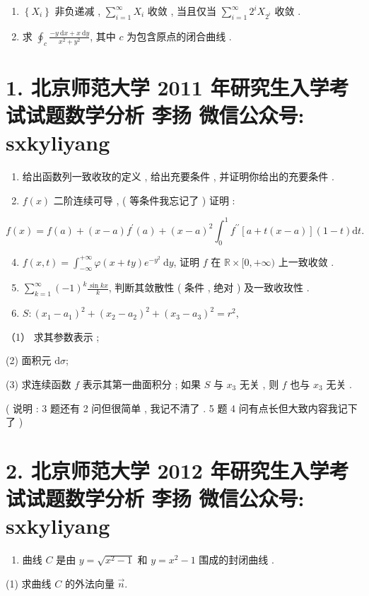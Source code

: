 \documentclass[10pt]{article}
\begin{document}
{\begin{enumerate}
  \item $\left\{X_{i}\right\}$  非负递减 , $\sum_{i=1}^{\infty} X_{i}$  收敛 ,  当且仅当  $\sum_{i=1}^{\infty} 2^{i} X_{2^{i}}$  收敛 .

  \item  求  $\oint_{c} \frac{-y \mathrm{~d} x+x \mathrm{~d} y}{x^{2}+y^{2}}$,  其中  $c$  为包含原点的闭合曲线 .

\end{enumerate}
\section{1. 北京师范大学 2011 年研究生入学考试试题数学分析 
 李扬 
 微信公众号: sxkyliyang}
\begin{enumerate}
  \item  给出函数列一致收玫的定义 ,  给出充要条件 ,  并证明你给出的充要条件 .

  \item $f(x)$  二阶连续可导 , ( 等条件我忘记了 )  证明 :

\end{enumerate}
$$
f(x)=f(a)+(x-a) f^{\prime}(a)+(x-a)^{2} \int_{0}^{1} f^{\prime \prime}[a+t(x-a)](1-t) \mathrm{d} t .
$$

\begin{enumerate}
  \setcounter{enumi}{3}
  \item $f(x, t)=\int_{-\infty}^{+\infty} \varphi(x+t y) e^{-y^{2}} \mathrm{~d} y$,  证明  $f$  在  $\mathbb{R} \times[0,+\infty)$  上一致收敛 .

  \item $\sum_{k=1}^{\infty}(-1)^{k} \frac{\sin k x}{k}$,  判断其敛散性  ( 条件 ,  绝对 )  及一致收玫性 .

  \item $S:\left(x_{1}-a_{1}\right)^{2}+\left(x_{2}-a_{2}\right)^{2}+\left(x_{3}-a_{3}\right)^{2}=r^{2}$,

\end{enumerate}
（1） 求其参数表示 ;

(2)  面积元  $\mathrm{d} \sigma$;

(3)  求连续函数  $f$  表示其第一曲面积分 ;  如果  $S$  与  $x_{3}$  无关 ,  则  $f$  也与  $x_{3}$  无关 .

( 说明 : 3  题还有  2  问但很简单 ,  我记不清了 . 5  题  4  问有点长但大致内容我记下了 )

\section{2. 北京师范大学 2012 年研究生入学考试试题数学分析 
 李扬 
 微信公众号: sxkyliyang}
\begin{enumerate}
  \item  曲线  $C$  是由  $y=\sqrt{x^{2}-1}$  和  $y=x^{2}-1$  围成的封闭曲线 .
\end{enumerate}
(1)  求曲线  $C$  的外法向量  $\vec{n}$.

}
\end{document}
